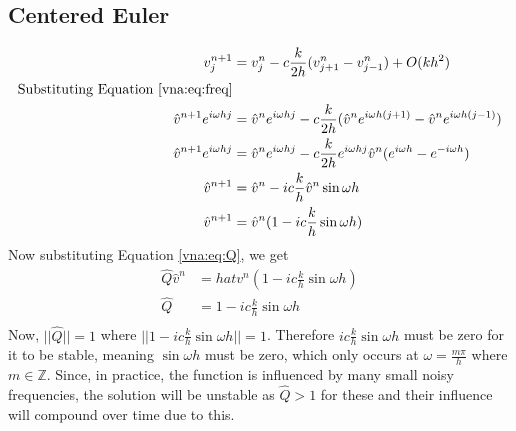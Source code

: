 \subsection{Centered Euler}
\begin{equation*}
\begin{align}
    v_j^{n+1}	&= v_j^n - c\frac{k}{2h}(v_{j+1}^n - v_{j-1}^n) + O(kh^2)	\\
    \text{Substituting Equation \ref{vna:eq:freq}} 				\\
    \hat{v}^{n+1}e^{i\omega hj} &= \hat{v}^ne^{i\omega hj} - c\frac{k}{2h} (\hat{v}^ne^{i\omega h(j+1)} - \hat{v}^ne^{i\omega h(j-1)})						    \\
    \hat{v}^{n+1}e^{i\omega hj} &= \hat{v}^ne^{i\omega hj} - c\frac{k}{2h} e^{i\omega hj} \hat{v}^n (e^{i\omega h} - e^{-i\omega h})							    \\
    \hat{v}^{n+1} &= \hat{v}^n - ic\frac{k}{h} \hat{v}^n \sin{\omega h}		\\
    \hat{v}^{n+1} &= \hat{v}^n(1 - ic\frac{k}{h} \sin{\omega h})
\end{align}
\end{equation*}
Now substituting Equation \ref{vna:eq:Q}, we get
\begin{equation*}
\begin{align}
    \hat{Q}\hat{v}^n &= hat{v}^n(1 - ic\frac{k}{h} \sin{\omega h})	\\
    \hat{Q} &= 1 - ic\frac{k}{h} \sin{\omega h}				\\
\end{align}
\end{equation*}
Now, $||\hat{Q}|| = 1$ where $||1 - ic\frac{k}{h} \sin{\omega h}|| = 1$. Therefore $ic\frac{k}{h} \sin{\omega h}$ must be zero for it to be stable, meaning $\sin{\omega h}$ must be zero, which only occurs at $\omega=\frac{m\pi}{h}$ where $m \in \mathbb{Z}$. Since, in practice, the function is influenced by many small noisy frequencies, the solution will be unstable as $\hat{Q}>1$ for these and their influence will compound over time due to this.
